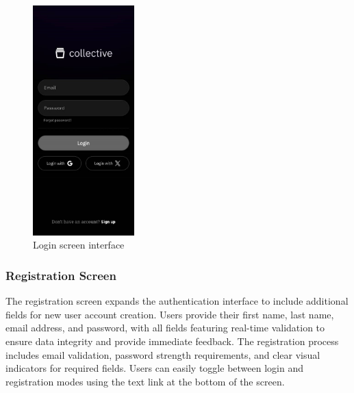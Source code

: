 \nopagebreak
\begin{figure}[H]
\centering
\includegraphics[width=0.35\textwidth]{files/imgs/prototype/auth_login.jpeg}
\caption{Login screen interface}
\label{fig:login-screen}
\end{figure}

\subsubsection{Registration Screen}

The registration screen expands the authentication interface to include additional fields for new user account creation. Users provide their first name, last name, email address, and password, with all fields featuring real-time validation to ensure data integrity and provide immediate feedback. The registration process includes email validation, password strength requirements, and clear visual indicators for required fields. Users can easily toggle between login and registration modes using the text link at the bottom of the screen.

